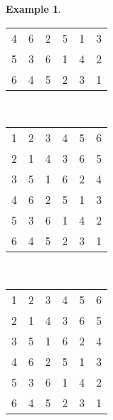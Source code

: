 \documentclass{article}
\theoremstyle{plain}
\theoremstyle{definition}
\newtheorem{example}[theorem]{Example}
\begin{document}
\begin{example}
\begin{center}
\begin{tabular}{@{}c@{}c@{}c@{}c@{}c@{}c@{}}
\color{lgr}4&\color{lgr}6&\color{lgr}2&\color{lgr}5&\color{lgr}1&\color{lgr}3\\
\color{lgr}5&\color{lgr}3&\color{lgr}6&\color{lgr}1&\color{lgr}4&\color{lgr}2\\
6&\color{lgr}4&\color{lgr}5&\color{lgr}2&\color{lgr}3&1\\
\end{tabular}\ \ \ \ 
\begin{tabular}{@{}c@{}c@{}c@{}c@{}c@{}c@{}}
1&\color{lgr}2&3&\color{lgr}4&\color{lgr}5&\color{lgr}6\\
\color{lgr}2&\color{lgr}1&\color{lgr}4&\color{lgr}3&\color{lgr}6&\color{lgr}5\\
3&\color{lgr}5&1&\color{lgr}6&\color{lgr}2&\color{lgr}4\\
\color{lgr}4&\color{lgr}6&\color{lgr}2&\color{lgr}5&\color{lgr}1&\color{lgr}3\\
\color{lgr}5&\color{lgr}3&\color{lgr}6&\color{lgr}1&\color{lgr}4&\color{lgr}2\\
\color{lgr}6&\color{lgr}4&\color{lgr}5&\color{lgr}2&\color{lgr}3&\color{lgr}1\\
\end{tabular}\ \ \ \ 
\begin{tabular}{@{}c@{}c@{}c@{}c@{}c@{}c@{}}
1&\color{lgr}2&\color{lgr}3&4&5&\color{lgr}6\\
\color{lgr}2&\color{lgr}1&\color{lgr}4&\color{lgr}3&\color{lgr}6&\color{lgr}5\\
\color{lgr}3&\color{lgr}5&\color{lgr}1&\color{lgr}6&\color{lgr}2&\color{lgr}4\\
4&\color{lgr}6&\color{lgr}2&5&1&\color{lgr}3\\
5&\color{lgr}3&\color{lgr}6&1&4&\color{lgr}2\\
\color{lgr}6&\color{lgr}4&\color{lgr}5&\color{lgr}2&\color{lgr}3&\color{lgr}1\\
\end{tabular}
\end{center} 
\end{example}
\end{document}
